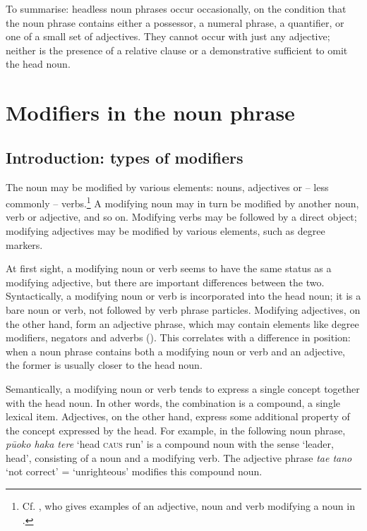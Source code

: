 To summarise: headless noun phrases occur occasionally, on the condition that the noun phrase contains either a possessor, a numeral phrase, a quantifier, or one of a small set of adjectives. They cannot occur with just any adjective; neither is the presence of a relative clause or a demonstrative sufficient to omit the head noun.

\section{Modifiers in the noun phrase}\label{sec:5.7}
\subsection{Introduction: types of modifiers}\label{sec:5.7.1}

The noun may be modified by various elements: nouns, adjectives or – less commonly – verbs.\footnote{\label{fn:265}Cf. \citet[325]{Vernaudon2011}, who gives examples of an adjective, noun and verb modifying a noun in .} A modifying noun may in turn be modified by another noun, verb or adjective, and so on. Modifying verbs may be followed by a direct object; modifying adjectives may be modified by various elements, such as degree markers.

At first sight, a modifying noun or verb seems to have the same status as a modifying adjective, but there are important differences between the two. Syntactically, a modifying noun or verb is incorporated into the head noun; it is a bare noun or verb, not followed by verb phrase particles. Modifying adjectives, on the other hand, form an adjective phrase, which may contain elements like degree modifiers, negators and adverbs (). This correlates with a difference in position: when a noun phrase contains both a modifying noun or verb and an adjective, the former is usually closer to the head noun.

Semantically, a modifying noun or verb tends to express a single concept together with the head noun. In other words, the combination is a compound, a single lexical item. Adjectives, on the other hand, express some additional property of the concept expressed by the head. For example, in the following noun phrase, \textit{pū{\ꞌ}oko haka tere} ‘head \textsc{caus} run’ is a compound noun with the sense ‘leader, head’, consisting of a noun and a modifying verb. The adjective phrase \textit{ta{\ꞌ}e tano} ‘not correct’ = ‘unrighteous’ modifies this compound noun.

